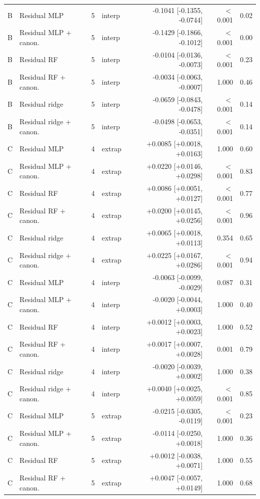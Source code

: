 \begin{longtable}{llrlrrr}
B & Residual MLP & 5 & interp & -0.1041 [-0.1355, -0.0744] & $<$0.001 & 0.02 \\
B & Residual MLP + canon. & 5 & interp & -0.1429 [-0.1866, -0.1012] & $<$0.001 & 0.00 \\
B & Residual RF & 5 & interp & -0.0104 [-0.0136, -0.0073] & $<$0.001 & 0.23 \\
B & Residual RF + canon. & 5 & interp & -0.0034 [-0.0063, -0.0007] & 1.000 & 0.46 \\
B & Residual ridge & 5 & interp & -0.0659 [-0.0843, -0.0478] & $<$0.001 & 0.14 \\
B & Residual ridge + canon. & 5 & interp & -0.0498 [-0.0653, -0.0351] & $<$0.001 & 0.14 \\
C & Residual MLP & 4 & extrap & +0.0085 [+0.0018, +0.0163] & 1.000 & 0.60 \\
C & Residual MLP + canon. & 4 & extrap & +0.0220 [+0.0146, +0.0298] & $<$0.001 & 0.83 \\
C & Residual RF & 4 & extrap & +0.0086 [+0.0051, +0.0127] & $<$0.001 & 0.77 \\
C & Residual RF + canon. & 4 & extrap & +0.0200 [+0.0145, +0.0256] & $<$0.001 & 0.96 \\
C & Residual ridge & 4 & extrap & +0.0065 [+0.0018, +0.0113] & 0.354 & 0.65 \\
C & Residual ridge + canon. & 4 & extrap & +0.0225 [+0.0167, +0.0286] & $<$0.001 & 0.94 \\
C & Residual MLP & 4 & interp & -0.0063 [-0.0099, -0.0029] & 0.087 & 0.31 \\
C & Residual MLP + canon. & 4 & interp & -0.0020 [-0.0044, +0.0003] & 1.000 & 0.40 \\
C & Residual RF & 4 & interp & +0.0012 [+0.0003, +0.0023] & 1.000 & 0.52 \\
C & Residual RF + canon. & 4 & interp & +0.0017 [+0.0007, +0.0028] & 0.001 & 0.79 \\
C & Residual ridge & 4 & interp & -0.0020 [-0.0039, +0.0002] & 1.000 & 0.38 \\
C & Residual ridge + canon. & 4 & interp & +0.0040 [+0.0025, +0.0059] & $<$0.001 & 0.85 \\
C & Residual MLP & 5 & extrap & -0.0215 [-0.0305, -0.0119] & $<$0.001 & 0.23 \\
C & Residual MLP + canon. & 5 & extrap & -0.0114 [-0.0250, +0.0018] & 1.000 & 0.36 \\
C & Residual RF & 5 & extrap & +0.0012 [-0.0038, +0.0071] & 1.000 & 0.55 \\
C & Residual RF + canon. & 5 & extrap & +0.0047 [-0.0057, +0.0149] & 1.000 & 0.68 \\

\end{longtable}
